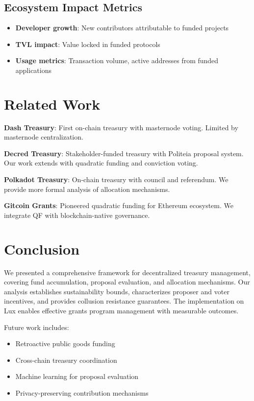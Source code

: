 \documentclass[11pt,a4paper]{article}
\begin{document}
\subsection{Ecosystem Impact Metrics}

\begin{itemize}
    \item \textbf{Developer growth}: New contributors attributable to funded projects
    \item \textbf{TVL impact}: Value locked in funded protocols
    \item \textbf{Usage metrics}: Transaction volume, active addresses from funded applications
\end{itemize}

\section{Related Work}

\textbf{Dash Treasury}: First on-chain treasury with masternode voting. Limited by masternode centralization.

\textbf{Decred Treasury}: Stakeholder-funded treasury with Politeia proposal system. Our work extends with quadratic funding and conviction voting.

\textbf{Polkadot Treasury}: On-chain treasury with council and referendum. We provide more formal analysis of allocation mechanisms.

\textbf{Gitcoin Grants}: Pioneered quadratic funding for Ethereum ecosystem. We integrate QF with blockchain-native governance.

\section{Conclusion}

We presented a comprehensive framework for decentralized treasury management, covering fund accumulation, proposal evaluation, and allocation mechanisms. Our analysis establishes sustainability bounds, characterizes proposer and voter incentives, and provides collusion resistance guarantees. The implementation on Lux enables effective grants program management with measurable outcomes.

Future work includes:
\begin{itemize}
    \item Retroactive public goods funding
    \item Cross-chain treasury coordination
    \item Machine learning for proposal evaluation
    \item Privacy-preserving contribution mechanisms
\end{itemize}
\end{document}
